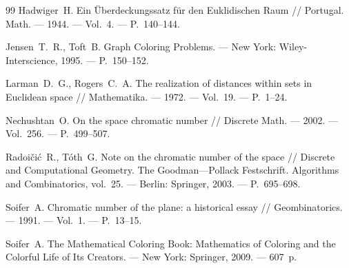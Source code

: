 \documentclass[12pt]{article}
\theoremstyle{plain}
\theoremstyle{definition}
\theoremstyle{remark}
\begin{document}
\begin{thebibliography}{99}
Hadwiger~H. Ein \"Uberdeckungssatz f\"ur den Euklidischen Raum //
Portugal. Math. --- 1944. --- Vol.~4. --- P.~140--144.

Jensen~T.~R., Toft~B. Graph Coloring Problems. --- New York:
Wiley-Interscience, 1995. --- P.~150--152.

Larman~D.~G., Rogers~C.~A. The realization of distances within sets in
Euclidean space // Mathematika. --- 1972. --- Vol.~19. --- P.~1--24.

Nechushtan~O. On the space chromatic number // Discrete Math. --- 2002. ---
Vol.~256. --- P.~499--507.

Radoi\v{c}i\'c~R., T\'oth~G. Note on the chromatic number of the space //
Discrete and Computational Geometry. The Goodman---Pollack Festschrift.
Algorithms and Combinatorics, vol.~25. --- Berlin: Springer, 2003. ---
P.~695--698.

Soifer~A. Chromatic number of the plane: a historical essay //
Geombinatorics. --- 1991. --- Vol.~1. --- P.~13--15.

Soifer~A. The Mathematical Coloring Book: Mathematics of Coloring and the
Colorful Life of Its Creators. --- New York: Springer, 2009. --- 607~p.

\end{thebibliography}
\end{document}
